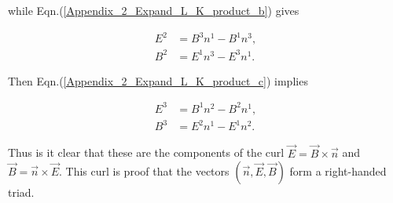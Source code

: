 \begin{appendix}
\noindent while Eqn.(\ref{Appendix_2_Expand_L_K_product_b}) gives

\begin{align*} 
E^2 & = B^3 n^1 - B^1n^3, \\
B^2 & = E^1 n^3 - E^3 n^1.
\end{align*} 

\noindent Then Eqn.(\ref{Appendix_2_Expand_L_K_product_c}) implies

\begin{align*}
E^3 & = B^1 n^2 - B^2 n^1,\\
B^3 & = E^2 n^1 - E^1 n^2.
\end{align*}

\noindent Thus is it clear that these are the components of the curl $\vec{E} = \vec{B} \times \vec{n}$ and $\vec{B} = \vec{n} \times \vec{E}$. This curl is proof that the vectors $(\vec{n}, \vec{E}, \vec{B})$ form a right-handed triad. 




\end{appendix}

